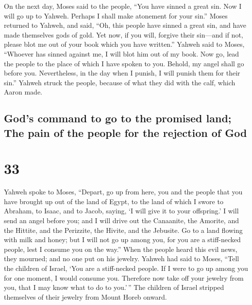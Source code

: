  On the next day, Moses said to the people, ``You have
sinned a great sin. Now I will go up to Yahweh. Perhaps I shall make
atonement for your sin.''  Moses returned to Yahweh, and
said, ``Oh, this people have sinned a great sin, and have made
themselves gods of gold.  Yet now, if you will, forgive
their sin---and if not, please blot me out of your book which you have
written.''  Yahweh said to Moses, ``Whoever has sinned
against me, I will blot him out of my book.  Now go, lead
the people to the place of which I have spoken to you. Behold, my angel
shall go before you. Nevertheless, in the day when I punish, I will
punish them for their sin.''  Yahweh struck the people,
because of what they did with the calf, which Aaron made.

\hypertarget{gods-command-to-go-to-the-promised-land-the-pain-of-the-people-for-the-rejection-of-god}{%
\subsection{God's command to go to the promised land; The pain of the
people for the rejection of
God}\label{gods-command-to-go-to-the-promised-land-the-pain-of-the-people-for-the-rejection-of-god}}

\hypertarget{section-32}{%
\section{33}\label{section-32}}

 Yahweh spoke to Moses, ``Depart, go up from here, you and
the people that you have brought up out of the land of Egypt, to the
land of which I swore to Abraham, to Isaac, and to Jacob, saying, `I
will give it to your offspring.'  I will send an angel
before you; and I will drive out the Canaanite, the Amorite, and the
Hittite, and the Perizzite, the Hivite, and the Jebusite. 
Go to a land flowing with milk and honey; but I will not go up among
you, for you are a stiff-necked people, lest I consume you on the way.''
 When the people heard this evil news, they mourned; and
no one put on his jewelry.  Yahweh had said to Moses,
``Tell the children of Israel, `You are a stiff-necked people. If I were
to go up among you for one moment, I would consume you. Therefore now
take off your jewelry from you, that I may know what to do to you.'\,''
 The children of Israel stripped themselves of their
jewelry from Mount Horeb onward.

